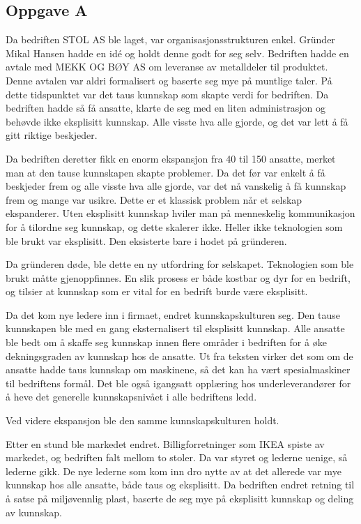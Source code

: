 \subsection{Oppgave A}
Da bedriften STOL AS ble laget, var organisasjonsstrukturen enkel.
Gründer Mikal Hansen hadde en idé og holdt denne godt for seg selv.
Bedriften hadde en avtale med MEKK OG BØY AS om leveranse av metalldeler til produktet. Denne avtalen var aldri formalisert og baserte seg mye på muntlige taler.
På dette tidspunktet var det taus kunnskap som skapte verdi for bedriften.
Da bedriften hadde så få ansatte, klarte de seg med en liten administrasjon og behøvde ikke eksplisitt kunnskap. Alle visste hva alle gjorde, og det var lett å få gitt riktige beskjeder.

Da bedriften deretter fikk en enorm ekspansjon fra 40 til 150 ansatte, merket man at den tause kunnskapen skapte problemer. Da det før var enkelt å få beskjeder frem og alle visste hva alle gjorde, var det nå vanskelig å få kunnskap frem og mange var usikre.
Dette er et klassisk problem når et selskap ekspanderer.
Uten eksplisitt kunnskap hviler man på menneskelig kommunikasjon for å tilordne seg kunnskap, og dette skalerer ikke.
Heller ikke teknologien som ble brukt var eksplisitt. Den eksisterte bare i hodet på gründeren.

Da gründeren døde, ble dette en ny utfordring for selskapet. Teknologien som ble brukt måtte gjenoppfinnes.
En slik prosess er både kostbar og dyr for en bedrift, og tilsier at kunnskap som er vital for en bedrift burde være eksplisitt.

Da det kom nye ledere inn i firmaet, endret kunnskapskulturen seg. Den tause kunnskapen ble med en gang eksternalisert til eksplisitt kunnskap.
Alle ansatte ble bedt om å skaffe seg kunnskap innen flere områder i bedriften for å øke dekningsgraden av kunnskap hos de ansatte.
Ut fra teksten virker det som om de ansatte hadde taus kunnskap om maskinene, så det kan ha vært spesialmaskiner til bedriftens formål.
Det ble også igangsatt opplæring hos underleverandører for å heve det generelle kunnskapsnivået i alle bedriftens ledd.

Ved videre ekspansjon ble den samme kunnskapskulturen holdt.

Etter en stund ble markedet endret. Billigforretninger som IKEA spiste av markedet, og bedriften falt mellom to stoler. Da var styret og lederne uenige, så lederne gikk.
De nye lederne som kom inn dro nytte av at det allerede var mye kunnskap hos alle ansatte, både taus og eksplisitt.
Da bedriften endret retning til å satse på miljøvennlig plast, baserte de seg mye på eksplisitt kunnskap og deling av kunnskap.

